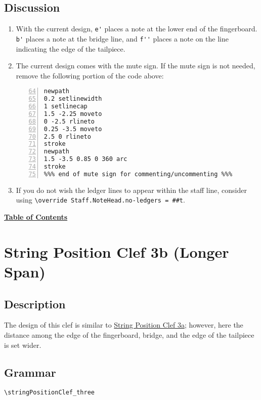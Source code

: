 \subsection{Discussion}
\begin{enumerate}
\item With the current design, \verb|e'| places a note at the lower end of the fingerboard. \verb|b'| places a note at the bridge line, and \verb|f''| places a note on the line indicating the edge of the tailpiece. 

\item The current design comes with the mute sign. If the mute sign is not needed, remove the following portion of the code above:

\begin{Verbatim}[numbers=left,xleftmargin=5mm,firstnumber=64]
%%% mute sign; commentify if not needed %%%
newpath
0.2 setlinewidth
1 setlinecap
1.5 -2.25 moveto
0 -2.5 rlineto
0.25 -3.5 moveto
2.5 0 rlineto
stroke
newpath
1.5 -3.5 0.85 0 360 arc
stroke
%%% end of mute sign for commenting/uncommenting %%%
\end{Verbatim}

\item If you do not wish the ledger lines to appear within the staff line, consider using \verb|\override Staff.NoteHead.no-ledgers = ##t|.
\end{enumerate}

\hyperref[sec:toc]{\textbf{Table of Contents}}

\vfill \break


\section {String Position Clef 3b (Longer Span)}
\hfill
{}
\hfill

\subsection{Description}
The design of this clef is similar to \hyperref[sec:StringPositionClef3a]{String Position Clef 3a}; however, here the distance among the edge of the fingerboard, bridge, and the edge of the tailpiece is set wider. 
\subsection{Grammar}
\begin{verbatim}
\stringPositionClef_three 
\end{verbatim}

